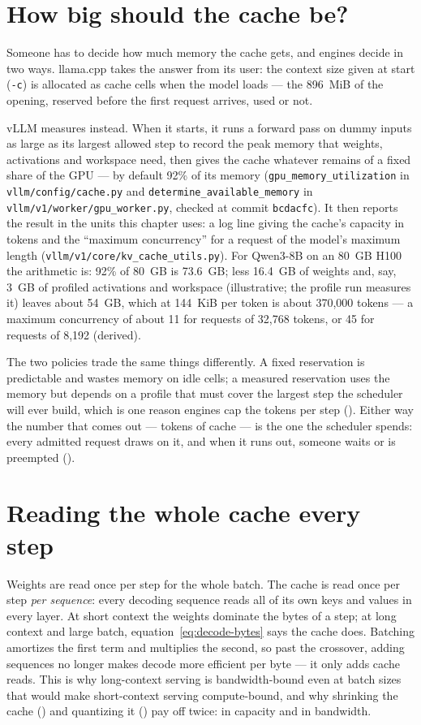 \section{How big should the cache be?}

Someone has to decide how much memory the cache gets, and engines decide in two
ways. llama.cpp takes the answer from its user: the context size given at start
(\texttt{-c}) is allocated as cache cells when the model loads --- the 896~MiB
of the opening, reserved before the first request arrives, used or not.

vLLM measures instead. When it starts, it runs a forward pass on dummy inputs
as large as its largest allowed step to record the peak memory that weights,
activations and workspace need, then gives the cache whatever remains of a
fixed share of the GPU --- by default 92\% of its memory
(\texttt{gpu\_memory\_utilization} in \texttt{vllm/config/cache.py} and
\texttt{determine\_available\_memory} in \texttt{vllm/v1/worker/gpu\_worker.py},
checked at commit \texttt{bcdacfc}). It then reports the result in the units
this chapter uses: a log line giving the cache's capacity in tokens and the
``maximum concurrency'' for a request of the model's maximum length
(\texttt{vllm/v1/core/kv\_cache\_utils.py}). For Qwen3-8B on an 80~GB H100 the
arithmetic is: 92\% of 80~GB is 73.6~GB; less 16.4~GB of weights and, say,
3~GB of profiled activations and workspace (illustrative; the profile run
measures it) leaves about 54~GB, which at 144~KiB per token is about 370,000
tokens --- a maximum concurrency of about 11 for requests of 32,768 tokens, or
45 for requests of 8,192 (derived).

The two policies trade the same things differently. A fixed reservation is
predictable and wastes memory on idle cells; a measured reservation uses the
memory but depends on a profile that must cover the largest step the scheduler
will ever build, which is one reason engines cap the tokens per step
(). Either way the number that comes out --- tokens of
cache --- is the one the scheduler spends: every admitted request draws on it,
and when it runs out, someone waits or is preempted ().

\section{Reading the whole cache every step}

Weights are read once per step for the whole batch. The cache is read once per
step \emph{per sequence}: every decoding sequence reads all of its own keys and
values in every layer. At short context the weights dominate the bytes of a
step; at long context and large batch, equation~\eqref{eq:decode-bytes} says
the cache does. Batching amortizes the first term and multiplies the second, so
past the crossover, adding sequences no longer makes decode more efficient per
byte --- it only adds cache reads. This is why long-context serving is
bandwidth-bound even at batch sizes that would make short-context serving
compute-bound, and why shrinking the cache () and
quantizing it () pay off twice: in capacity and in
bandwidth.

